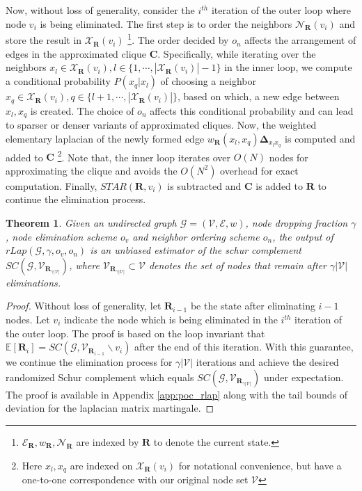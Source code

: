 \documentclass{article}
\def\mC{{\mathbf{C}}}
\def\mR{{\mathbf{R}}}
\def\gE{{\mathcal{E}}}
\def\gG{{\mathcal{G}}}
\def\gV{{\mathcal{V}}}
\theoremstyle{plain}
\newtheorem{theorem}{Theorem}[section]
\theoremstyle{definition}
\theoremstyle{remark}
\begin{document}
Now, without loss of generality, consider the $i^{th}$ iteration of the outer loop where node $v_i$ is being eliminated. The first step is to order the neighbors $\mathcal{N}_{\mR}(v_i)$ and store the result in $\mathcal{X}_{\mR}(v_i)$ \footnote{$\gE_{\mR}, w_{\mR}, \mathcal{N}_{\mR}$ are indexed by $\mR$ to denote the current state.}. The order decided by $o_n$ affects the arrangement of edges in the approximated clique $\mC$. Specifically, while iterating over the neighbors $x_l \in \mathcal{X}_{\mR}(v_i), l \in \{1, \cdots, |\mathcal{X}_{\mR}(v_i)|-1\}$ in the inner loop, we compute a conditional probability $P(x_q|x_l)$ of choosing a neighbor $x_q \in \mathcal{X}_{\mR}(v_i), q \in \{l+1, \cdots, |\mathcal{X}_{\mR}(v_i)|\}$, based on which, a new edge between $x_l, x_q$ is created. The choice of $o_n$ affects this conditional probability and can lead to sparser or denser variants of approximated cliques. Now, the weighted elementary laplacian  of the newly formed edge $w_{\mR}(x_l, x_q) \mathbf{\Delta}_{x_lx_q}$ is computed and added to $\mC$ \footnote{Here $x_l, x_q$ are indexed on $\mathcal{X}_{\mR}(v_i)$ for notational convenience, but have a one-to-one correspondence with our original node set $\gV$}. Note that, the inner loop iterates over $O(N)$ nodes for approximating the clique and avoids the $O(N^2)$ overhead for exact computation. Finally, $\textit{STAR}(\mR, v_i)$ is subtracted and $\mC$ is added to $\mR$ to continue the elimination process.


\begin{theorem}
\label{thm:rlap}
Given an undirected graph $\gG=(\gV, \gE, w)$, node dropping fraction $\gamma$, node elimination scheme $o_v$ and neighbor ordering scheme $o_n$, the output of $rLap(\gG, \gamma, o_v, o_n)$ is an unbiased estimator of the schur complement $SC(\gG, \gV_{\mR_{\gamma|\gV|}})$, where $\gV_{\mR_{\gamma|\gV|}} \subset \gV$ denotes the set of nodes that remain after $\gamma|\gV|$ eliminations.
\end{theorem}
\begin{proof} Without loss of generality, let $\mR_{i-1}$ be the state after eliminating $i-1$ nodes. Let $v_i$ indicate the node which is being eliminated in the $i^{th}$ iteration of the outer loop. The proof is based on the loop invariant that $\mathbb{E}[\mR_i] = SC(\gG, \gV_{\mR_{i-1}}\backslash v_i)$ after the end of this iteration. With this guarantee, we continue the elimination process for $\gamma|\gV|$ iterations and achieve the desired randomized Schur complement which equals $SC(\gG, \gV_{\mR_{\gamma|\gV|}})$ under expectation.  The proof is available in Appendix \ref{app:poc_rlap} along with the tail bounds of deviation for the laplacian matrix martingale.
\end{proof}
\end{document}
